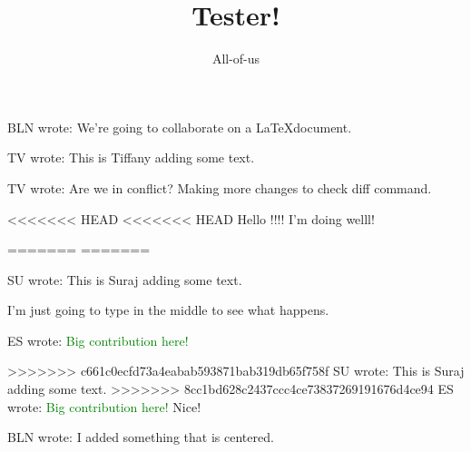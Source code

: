 \documentclass[12pt]{article}
\title{Tester!}
\author{All-of-us}
\newcommand{\bln}[1]{BLN wrote: \textcolor{red!70!blue!70}{#1}}
\newcommand{\tv}[1]{TV wrote: \textcolor{blue!70}{#1}}
\newcommand{\su}[1]{SU wrote: \textcolor{green!70}{#1}}
\newcommand{\su}[1]{SU wrote: \textcolor{green!70}{#1}}
\newcommand{\es}[1]{ES wrote: \textcolor{green}{#1}}
\begin{document}
\maketitle

\bln{We're going to collaborate on a \LaTeX document.}

\tv{This is Tiffany adding some text.}

\tv{Are we in conflict? Making more changes to check diff command.}

<<<<<<< HEAD
<<<<<<< HEAD
Hello !!!! I'm doing welll!

=======
=======

\su{This is Suraj adding some text.}

I'm just going to type in the middle to see what happens.

\es{Big contribution here!}

>>>>>>> c661c0ecfd73a4eabab593871bab319db65f758f
\su{This is Suraj adding some text.}
>>>>>>> 8cc1bd628c2437ccc4ce73837269191676d4ce94
\es{Big contribution here!}
{Nice!}



\begin{center}
  \bln{I added something that is centered.}
\end{center}
\end{document}
